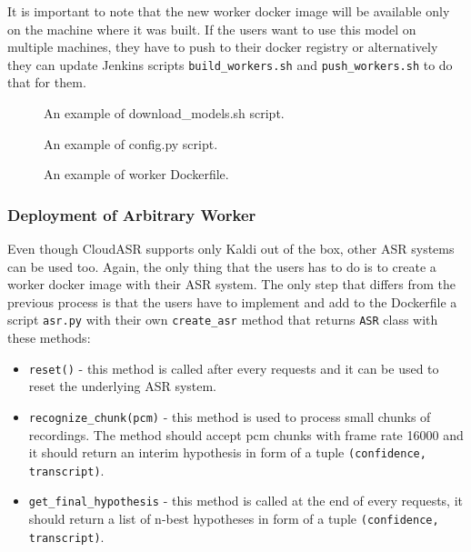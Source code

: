 It is important to note that the new worker docker image will be available only on the machine where it was built.
If the users want to use this model on multiple machines, they have to push to their docker registry
  or alternatively they can update Jenkins scripts \texttt{build\_workers.sh} and \texttt{push\_workers.sh} to do that for them.

\begin{figure}[h]
  

  \caption{An example of download\_models.sh script.}
  \label{fig:download-models}
\end{figure}

\begin{figure}[h]
  

  \caption{An example of config.py script.}
  \label{fig:config-py}
\end{figure}

\begin{figure}[h]
  

  \caption{An example of worker Dockerfile.}
  \label{fig:worker-dockerfile}
\end{figure}


\subsubsection{Deployment of Arbitrary Worker}
Even though CloudASR supports only Kaldi out of the box, other ASR systems can be used too.
Again, the only thing that the users has to do is to create a worker docker image with their ASR system.
The only step that differs from the previous process is
  that the users have to implement and add to the Dockerfile a script \texttt{asr.py} with their own \texttt{create\_asr} method
  that returns \texttt{ASR} class with these methods:

\begin{itemize}
  \item
    \texttt{reset()} - this method is called after every requests
      and it can be used to reset the underlying ASR system.

  \item
    \texttt{recognize\_chunk(pcm)} - this method is used to process small chunks of recordings.
      The method should accept pcm chunks with frame rate 16000
        and it should return an interim hypothesis in form of a tuple \texttt{(confidence, transcript)}.

  \item
    \texttt{get\_final\_hypothesis} - this method is called at the end of every requests,
      it should return a list of n-best hypotheses in form of a tuple \texttt{(confidence, transcript)}.

\end{itemize}


